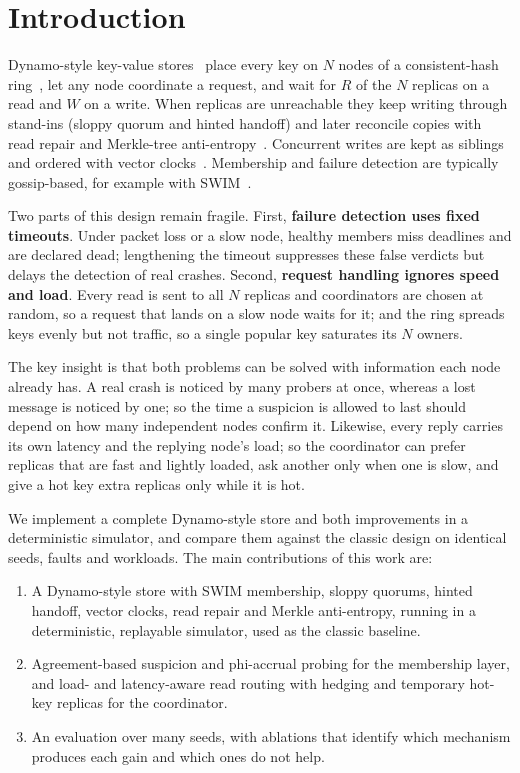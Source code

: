 \documentclass[sigconf,nonacm]{acmart}
\begin{document}
\maketitle

\section{Introduction}

Dynamo-style key-value stores~\cite{decandia2007dynamo,lakshman2010cassandra} place every key on $N$ nodes of a consistent-hash ring~\cite{karger1997consistent}, let any node coordinate a request, and wait for $R$ of the $N$ replicas on a read and $W$ on a write. When replicas are unreachable they keep writing through stand-ins (sloppy quorum and hinted handoff) and later reconcile copies with read repair and Merkle-tree anti-entropy~\cite{merkle1987digital}. Concurrent writes are kept as siblings and ordered with vector clocks~\cite{mattern1989virtual}. Membership and failure detection are typically gossip-based, for example with SWIM~\cite{das2002swim}.

Two parts of this design remain fragile. First, \textbf{failure detection uses fixed timeouts}. Under packet loss or a slow node, healthy members miss deadlines and are declared dead; lengthening the timeout suppresses these false verdicts but delays the detection of real crashes. Second, \textbf{request handling ignores speed and load}. Every read is sent to all $N$ replicas and coordinators are chosen at random, so a request that lands on a slow node waits for it; and the ring spreads keys evenly but not traffic, so a single popular key saturates its $N$ owners.

The key insight is that both problems can be solved with information each node already has. A real crash is noticed by many probers at once, whereas a lost message is noticed by one; so the time a suspicion is allowed to last should depend on how many independent nodes confirm it. Likewise, every reply carries its own latency and the replying node's load; so the coordinator can prefer replicas that are fast and lightly loaded, ask another only when one is slow, and give a hot key extra replicas only while it is hot.

We implement a complete Dynamo-style store and both improvements in a deterministic simulator, and compare them against the classic design on identical seeds, faults and workloads. The main contributions of this work are:
\begin{enumerate}
  \item A Dynamo-style store with SWIM membership, sloppy quorums, hinted handoff, vector clocks, read repair and Merkle anti-entropy, running in a deterministic, replayable simulator, used as the classic baseline.
  \item Agreement-based suspicion and phi-accrual probing for the membership layer, and load- and latency-aware read routing with hedging and temporary hot-key replicas for the coordinator.
  \item An evaluation over many seeds, with ablations that identify which mechanism produces each gain and which ones do not help.
\end{enumerate}
\end{document}
